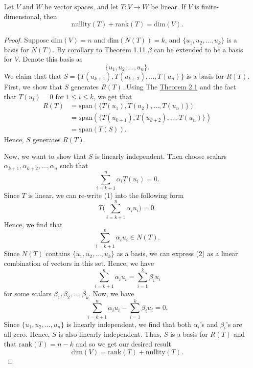 \begin{theorem}\label{Dimension Theorem}
   Let \( V  \) and \( W  \) be vector spaces, and let \( T: V \to W  \) be linear. If \( V  \) is finite-dimensional, then  
   \[ \text{nullity}(T) + \text{rank}(T) = \text{dim}(V).  \]
\end{theorem}
\begin{proof}
Suppose \( \text{dim}(V) = n  \) and \( \text{dim}(N(T)) = k  \), and \( \{ u_{1}, u_{2}, \dots, u_{k } \}  \) is a basis for \( N(T) \). By {\hyperref[Corollary to Theorem 1.11]{corollary to Theorem 1.11}} \( \beta \) can be extended to be a basis for \( V  \). Denote this basis as 
\[ \{ u_{1}, u_{2}, \dots, u_{n} \}.  \]
We claim that that \( S = \{ T(u_{k+1}), T(u_{k+2}), \dots, T(u_{n})  \}  \) is a basis for \( R(T) \).
First, we show that \( S  \) generates \( R(T) \). Using The {\hyperref[Spanning set for R(T)]{Theorem 2.1}} and the fact that \( T(u_{i}) = 0  \) for \( 1 \leq i \leq k  \), we get that 
\begin{align*}
    R(T) &= \text{span}(\{ T(u_{1}), T(u_{2}), \dots, T(u_{n}) \} ) \\
         &= \text{span}(\{T(u_{k+1}), T(u_{k+2}), \dots, T(u_{n})  \} )\\
         &= \text{span}(T(S)) .
\end{align*}
Hence, \( S  \) generates \( R(T) \).

Now, we want to show that \( S \) is linearly independent. Then choose scalars \( \alpha_{k+1}, \alpha_{k+2}, \dots, \alpha_{n} \) such that 
\[  \sum_{ i=k+1 }^{ n } \alpha_{i} T(u_{i}) = 0.  \tag{1} \]
Since \( T  \) is linear, we can re-write (1) into the following form
\[  T \Big( \sum_{ i= k+1  }^{ n } \alpha_{i} u_{i} \Big) = 0.  \]
Hence, we find that
\[  \sum_{ i=k+1 }^{ n }\alpha_{i} u_{i} \in N(T).\tag{2} \]
Since \( N(T) \) contains \( \{ u_{1}, u_{2}, \dots, u_{k} \}  \) as a basis, we can express (2) as a linear combination of vectors in this set. Hence, we have
\[  \sum_{ i=k+1 }^{ n } \alpha_{i} u_{i} = \sum_{ i=1 }^{ k  } \beta_{i} u_{i} \tag{3} \]
for some scalars \( \beta_{1}, \beta_{2}, \dots, \beta_{k} \).
Now, we have
\[  \sum_{ i=k+1 }^{ n } \alpha_{i} u_{i} - \sum_{ i=1 }^{ k  } \beta_{i} u_{i} = 0. \]
Since \( \{ u_{1}, u_{2}, \dots, u_{n}  \}   \) is linearly independent, we find that both \( \alpha_{i} \)'s and \( \beta_{i} \)'s are all zero. Hence, \( S  \) is also linearly independent. Thus, \( S  \) is a basis for \( R(T) \) and that \( \text{rank}(T) = n - k  \) and so we get our desired result
\[  \text{dim}(V) = \text{rank}(T) + \text{nullity}(T). \]
\end{proof}

